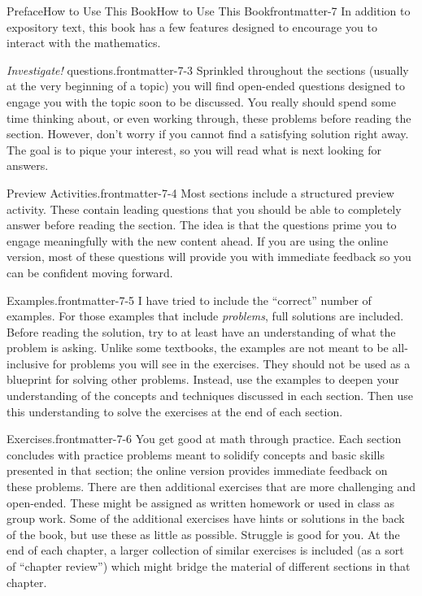 \documentclass[twoside,11pt,]{book}
\numberwithin{equation}{chapter}
\begin{document}
\begin{preface}{Preface}{How to Use This Book}{}{How to Use This Book}{}{}{frontmatter-7}
In addition to expository text, this book has a few features designed to encourage you to interact with the mathematics.%
\begin{paragraphs}{\emph{Investigate!} questions.}{frontmatter-7-3}%
Sprinkled throughout the sections (usually at the very beginning of a topic) you will find open-ended questions designed to engage you with the topic soon to be discussed. You really should spend some time thinking about, or even working through, these problems before reading the section.  However, don't worry if you cannot find a satisfying solution right away.  The goal is to pique your interest, so you will read what is next looking for answers.%
\end{paragraphs}%
\begin{paragraphs}{Preview Activities.}{frontmatter-7-4}%
Most sections include a structured preview activity.  These contain leading questions that you should be able to completely answer before reading the section.  The idea is that the questions prime you to engage meaningfully with the new content ahead.  If you are using the online version, most of these questions will provide you with immediate feedback so you can be confident moving forward.%
\end{paragraphs}%
\begin{paragraphs}{Examples.}{frontmatter-7-5}%
I have tried to include the ``correct'' number of examples. For those examples that include \emph{problems}, full solutions are included. Before reading the solution, try to at least have an understanding of what the problem is asking. Unlike some textbooks, the examples are not meant to be all-inclusive for problems you will see in the exercises. They should not be used as a blueprint for solving other problems. Instead, use the examples to deepen your understanding of the concepts and techniques discussed in each section. Then use this understanding to solve the exercises at the end of each section.%
\end{paragraphs}%
\begin{paragraphs}{Exercises.}{frontmatter-7-6}%
You get good at math through practice. Each section concludes with practice problems meant to solidify concepts and basic skills presented in that section; the online version provides immediate feedback on these problems.  There are then additional exercises that are more challenging and open-ended.  These might be assigned as written homework or used in class as group work.  Some of the additional exercises have hints or solutions in the back of the book, but use these as little as possible.  Struggle is good for you. At the end of each chapter, a larger collection of similar exercises is included (as a sort of ``chapter review'') which might bridge the material of different sections in that chapter.%

\end{paragraphs}
\end{preface}
\end{document}
